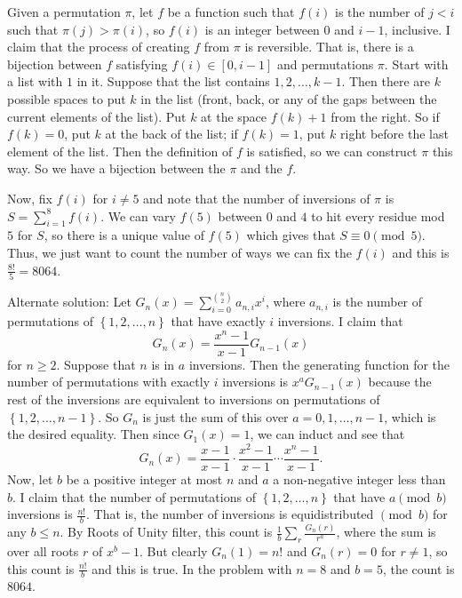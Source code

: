 Given a permutation $\pi$, let $f$ be a function such that $f\left(i\right)$ is the number of $j<i$ such that $\pi\left(j\right)>\pi\left(i\right)$, so $f\left(i\right)$ is an integer between $0$ and $i-1$, inclusive. I claim that the process of creating $f$ from $\pi$ is reversible. That is, there is a bijection between $f$ satisfying $f\left(i\right)\in\left[0,i-1\right]$ and permutations $\pi$. Start with a list with $1$ in it. Suppose that the list contains $1,2,\ldots,k-1$. Then there are $k$ possible spaces to put $k$ in the list (front, back, or any of the gaps between the current elements of the list). Put $k$ at the space $f\left(k\right)+1$ from the right. So if $f\left(k\right)=0$, put $k$ at the back of the list; if $f\left(k\right)=1$, put $k$ right before the last element of the list. Then the definition of $f$ is satisfied, so we can construct $\pi$ this way. So we have a bijection between the $\pi$ and the $f$.
	
	Now, fix $f\left(i\right)$ for $i\neq5$ and note that the number of inversions of $\pi$ is $S=\displaystyle\sum_{i=1}^8f\left(i\right)$. We can vary $f\left(5\right)$ between $0$ and $4$ to hit every residue mod $5$ for $S$, so there is a unique value of $f\left(5\right)$ which gives that $S\equiv0\pmod5$. Thus, we just want to count the number of ways we can fix the $f\left(i\right)$ and this is $\frac{8!}{5}=\boxed{8064}$.
	
	Alternate solution: Let $G_n\left(x\right)=\displaystyle\sum_{i=0}^{\binom{n}{2}}a_{n,i}x^i$, where $a_{n,i}$ is the number of permutations of $\left\{1,2,\ldots,n\right\}$ that have exactly $i$ inversions. I claim that \[G_n\left(x\right)=\frac{x^n-1}{x-1}G_{n-1}\left(x\right)\] for $n\geq2$. Suppose that $n$ is in $a$ inversions. Then the generating function for the number of permutations with exactly $i$ inversions is $x^aG_{n-1}\left(x\right)$ because the rest of the inversions are equivalent to inversions on permutations of $\left\{1,2,\ldots,n-1\right\}$. So $G_n$ is just the sum of this over $a=0,1,\ldots,n-1$, which is the desired equality. Then since $G_1\left(x\right)=1$, we can induct and see that \[G_n\left(x\right)=\frac{x-1}{x-1}\cdot\frac{x^2-1}{x-1}\cdots\frac{x^n-1}{x-1}.\] Now, let $b$ be a positive integer at most $n$ and $a$ a non-negative integer less than $b$. I claim that the number of permutations of $\left\{1,2,\ldots,n\right\}$ that have $a\pmod b$ inversions is $\frac{n!}{b}$. That is, the number of inversions is equidistributed $\pmod b$ for any $b\leq n$. By Roots of Unity filter, this count is $\frac{1}{b}\displaystyle\sum_{r}\frac{G_n\left(r\right)}{r^a}$, where the sum is over all roots $r$ of $x^b-1$. But clearly $G_n\left(1\right)=n!$ and $G_n\left(r\right)=0$ for $r\neq1$, so this count is $\frac{n!}{b}$ and this is true. In the problem with $n=8$ and $b=5$, the count is $\boxed{8064}$.